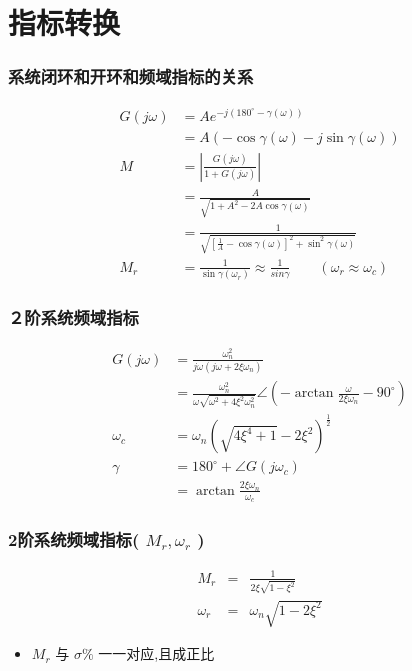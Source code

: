 \documentclass[table]{beamer}
\begin{document}
\section{指标转换}
\label{sec-3}
\begin{frame}
\frametitle{系统闭环和开环和频域指标的关系}
\label{sec-3-1}

\begin{align*}
G(j\omega) &= Ae^{-j(180^{\circ}-\gamma(\omega))}\\
&=A\left( -\cos\gamma(\omega)-j\sin\gamma(\omega)\right)\\
M&=\left|\frac{G(j\omega)}{1+G(j\omega)}\right| \\
 &=\frac{A}{\sqrt{1+A^2-2A\cos\gamma(\omega)}}\\
 &=\frac{1}{\sqrt{\left[\frac{1}{A}-\cos\gamma(\omega)\right]^2+\sin^2\gamma(\omega)}}\\
M_r &= \frac{1}{\sin\gamma(\omega_r)} \approx \frac{1}{sin\gamma}\qquad (\omega_r \approx \omega_c)
\end{align*}
\end{frame}
\begin{frame}
\frametitle{２阶系统频域指标}
\label{sec-3-2}

\begin{align*}
G(j\omega) &= \frac{\omega_n^2}{j\omega(j\omega+2\xi\omega_n)}\\
&=\frac{\omega_n^2}{\omega\sqrt{\omega^2+4\xi^2\omega_n^2}}\angle(-\arctan \frac{\omega}{2\xi\omega_n}-90^{\circ})\\
\omega_c &=\omega_n(\sqrt{4\xi^4+1}-2\xi^2)^{\frac{1}{2}}\\
\gamma &= 180^{\circ}+\angle G(j\omega_c) \\
 &=\arctan \frac{2\xi\omega_n}{\omega_c}
\end{align*}
\end{frame}
\begin{frame}
\frametitle{2阶系统频域指标( $M_r,\omega_r$ )}
\label{sec-3-3}

\begin{eqnarray*}
M_r & = &\frac{1}{2\xi\sqrt{1-\xi^2}} \\
\omega_r &=& \omega_n\sqrt{1-2\xi^2}
\end{eqnarray*}
\begin{itemize}
\item <2->$M_r$ 与 $\sigma\%$ 一一对应,且成正比
\end{itemize}
\end{frame}
\end{document}

